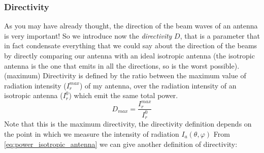 \subsubsection*{Directivity}
As you may have already thought, the direction of the beam waves of an antenna is very important! So we introduce now the \emph{directivity} $D$, that is a parameter that in fact condensate everything that we could say about the direction of the beams by directly comparing our antenna with an ideal isotropic antenna (the isotropic antenna is the one that emits in all the directions, so is the worst possible).\\
(maximum) Directivity is defined by the ratio between the maximum value of radiation intensity ($I_r^{max}$) of my antenna, over the radiation intensity of an isotropic antenna ($I_r^0$) which emit the same total power.
\begin{equation}
    D_{max}=\frac{I_r^{max}}{I_r^0}
\end{equation}
Note that this is the maximum directivity, the directivity definition depends on the point in which we measure the intensity of radiation $I_a(\theta,\varphi)$
From \cref{eq:power_isotropic_antenna} we can give another definition of directivity:

